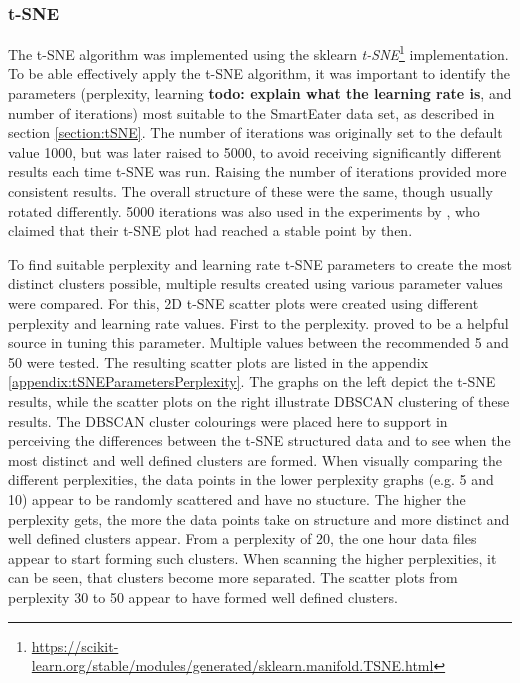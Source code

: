 \subsubsection{t-SNE}
\label{section:experimentTSNE}
The t-SNE algorithm was implemented using the sklearn \textit{t-SNE}\footnote{\url{https://scikit-learn.org/stable/modules/generated/sklearn.manifold.TSNE.html}} implementation.
To be able effectively apply the t-SNE algorithm, it was important to identify the parameters (perplexity, learning \textbf{todo: explain what the learning rate is}, and number of iterations) most suitable to the SmartEater data set, as described in section \ref{section:tSNE}. The number of iterations was originally set to the default value 1000, but was later raised to 5000, to avoid receiving significantly different results each time t-SNE was run. Raising the number of iterations provided more consistent results. The overall structure of these were the same, though usually rotated differently. 5000 iterations was also used in the experiments by \textcite{wattenberg2016how}, who claimed that their t-SNE plot had reached a stable point by then.

To find suitable perplexity and learning rate t-SNE parameters to create the most distinct clusters possible, multiple results created using various parameter values were compared. For this, 2D t-SNE scatter plots were created using different perplexity and learning rate values. 
First to the perplexity. \textcite{wattenberg2016how} proved to be a helpful source in tuning this parameter. Multiple values between the recommended 5 and 50 were tested. The resulting scatter plots are listed in the appendix \ref{appendix:tSNEParametersPerplexity}. The graphs on the left depict the t-SNE results, while the scatter plots on the right illustrate DBSCAN clustering of these results. The DBSCAN cluster colourings were placed here to support in perceiving the differences between the t-SNE structured data and to see when the most distinct and well defined clusters are formed. When visually comparing the different perplexities, the data points in the lower perplexity graphs (e.g. 5 and 10) appear to be randomly scattered and have no stucture. The higher the perplexity gets, the more the data points take on structure and more distinct and well defined clusters appear. From a perplexity of 20, the one hour data files appear to start forming such clusters. When scanning the higher perplexities, it can be seen, that clusters become more separated. The scatter plots from perplexity 30 to 50 appear to have formed well defined clusters. 

